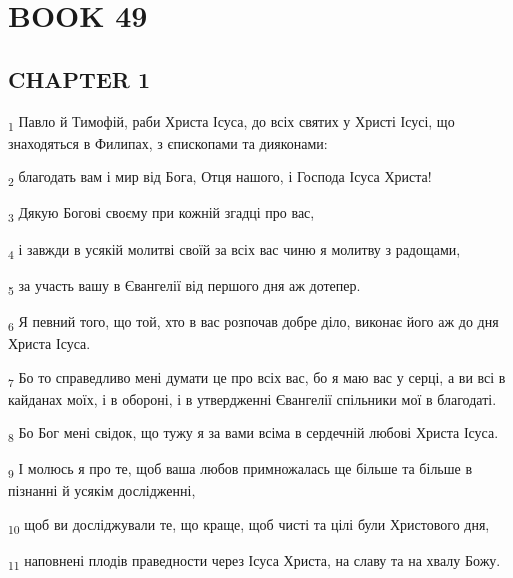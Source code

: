 \section{BOOK 49}
\subsection{CHAPTER 1}
\begin{tcolorbox}
\textsubscript{1} Павло й Тимофій, раби Христа Ісуса, до всіх святих у Христі Ісусі, що знаходяться в Филипах, з єпископами та дияконами:
\end{tcolorbox}
\begin{tcolorbox}
\textsubscript{2} благодать вам і мир від Бога, Отця нашого, і Господа Ісуса Христа!
\end{tcolorbox}
\begin{tcolorbox}
\textsubscript{3} Дякую Богові своєму при кожній згадці про вас,
\end{tcolorbox}
\begin{tcolorbox}
\textsubscript{4} і завжди в усякій молитві своїй за всіх вас чиню я молитву з радощами,
\end{tcolorbox}
\begin{tcolorbox}
\textsubscript{5} за участь вашу в Євангелії від першого дня аж дотепер.
\end{tcolorbox}
\begin{tcolorbox}
\textsubscript{6} Я певний того, що той, хто в вас розпочав добре діло, виконає його аж до дня Христа Ісуса.
\end{tcolorbox}
\begin{tcolorbox}
\textsubscript{7} Бо то справедливо мені думати це про всіх вас, бо я маю вас у серці, а ви всі в кайданах моїх, і в обороні, і в утвердженні Євангелії спільники мої в благодаті.
\end{tcolorbox}
\begin{tcolorbox}
\textsubscript{8} Бо Бог мені свідок, що тужу я за вами всіма в сердечній любові Христа Ісуса.
\end{tcolorbox}
\begin{tcolorbox}
\textsubscript{9} І молюсь я про те, щоб ваша любов примножалась ще більше та більше в пізнанні й усякім дослідженні,
\end{tcolorbox}
\begin{tcolorbox}
\textsubscript{10} щоб ви досліджували те, що краще, щоб чисті та цілі були Христового дня,
\end{tcolorbox}
\begin{tcolorbox}
\textsubscript{11} наповнені плодів праведности через Ісуса Христа, на славу та на хвалу Божу.
\end{tcolorbox}
